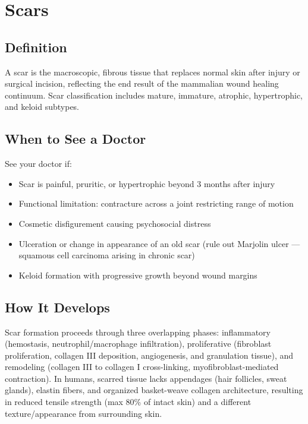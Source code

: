 \chapter{Scars}

\section*{Definition}
A scar is the macroscopic, fibrous tissue that replaces normal skin after injury or surgical incision, reflecting the end result of the mammalian wound healing continuum. Scar classification includes mature, immature, atrophic, hypertrophic, and keloid subtypes.

\section*{When to See a Doctor}
See your doctor if:
\begin{itemize}
  \item Scar is painful, pruritic, or hypertrophic beyond 3 months after injury
  \item Functional limitation: contracture across a joint restricting range of motion
  \item Cosmetic disfigurement causing psychosocial distress
  \item Ulceration or change in appearance of an old scar (rule out Marjolin ulcer --- squamous cell carcinoma arising in chronic scar)
  \item Keloid formation with progressive growth beyond wound margins
\end{itemize}

\section*{How It Develops}
Scar formation proceeds through three overlapping phases: inflammatory (hemostasis, neutrophil/macrophage infiltration), proliferative (fibroblast proliferation, collagen III deposition, angiogenesis, and granulation tissue), and remodeling (collagen III to collagen I cross-linking, myofibroblast-mediated contraction). In humans, scarred tissue lacks appendages (hair follicles, sweat glands), elastin fibers, and organized basket-weave collagen architecture, resulting in reduced tensile strength (max 80\% of intact skin) and a different texture/appearance from surrounding skin.

